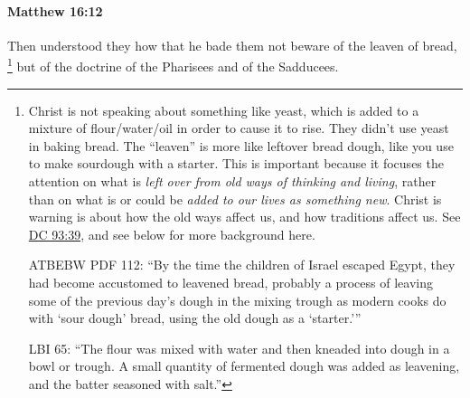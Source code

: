 		\paragraph{Matthew 16:12} %
			\label{MATTHEW-16-12}

			Then understood they how that he bade them not beware of the leaven of bread,
				\footnote{%
					Christ is not speaking about something like yeast, which is added to a mixture of flour/water/oil in order to cause it to rise. They didn't use yeast in baking bread. The ``leaven'' is more like leftover bread dough, like you use to make sourdough with a starter. This is important because it focuses the attention on what is \textit{left over from old ways of thinking and living}, rather than on what is or could be \textit{added to our lives as something new}. Christ is warning is about how the old ways affect us, and how traditions affect us. See \hyperref[DC93-39]{DC 93:39}, and see below for more background here. 
					
					ATBEBW PDF 112: ``By the time the children of Israel escaped Egypt, they had become accustomed to leavened bread, probably a process of leaving some of the previous day's dough in the mixing trough as modern cooks do with `sour dough' bread, using the old dough as a `starter.'''
					
					LBI 65: ``The flour was mixed with water and then kneaded into dough in a bowl or trough. A small quantity of fermented dough was added as leavening, and the batter seasoned with salt.''
					}
			but of the doctrine of the Pharisees and of the Sadducees.

			\begin{framed}
			\scriptsize
				\begin{compactdesc}
					\item[SBLG] 
				\end{compactdesc}
			\end{framed}

